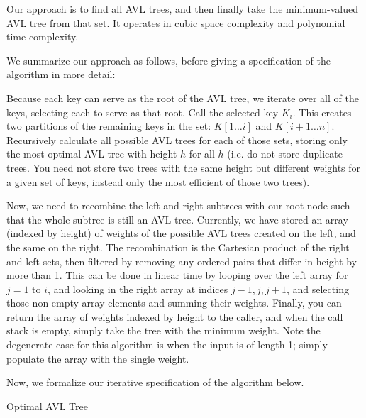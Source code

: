 \documentclass[12pt]{article}
\begin{document}
Our approach is to find all AVL trees, and then finally take the minimum-valued AVL tree from that set. It operates in cubic space complexity and polynomial time complexity.

We summarize our approach as follows, before giving a specification of the algorithm in more detail:

Because each key can serve as the root of the AVL tree, we iterate over all of the keys, selecting each to serve as that root. Call the selected key $K_i$. This creates two partitions of the remaining keys in the set: $K[1\dots i]$ and $K[i+1 \dots n]$. Recursively calculate all possible AVL trees for each of those sets, storing only the most optimal AVL tree with height $h$ for all $h$ (i.e. do not store duplicate trees. You need not store two trees with the same height but different weights for a given set of keys, instead only the most efficient of those two trees). 

Now, we need to recombine the left and right subtrees with our root node such that the whole subtree is still an AVL tree. Currently, we have stored an array (indexed by height) of weights of the possible AVL trees created on the left, and the same on the right. The recombination is the Cartesian product of the right and left sets, then filtered by removing any ordered pairs that differ in height by more than 1. This can be done in linear time by looping over the left array for $j = 1 \text{ to } i$, and looking in the right array at indices $j-1, j, j+1$, and selecting those non-empty array elements and summing their weights. Finally, you can return the array of weights indexed by height to the caller, and when the call stack is empty, simply take the tree with the minimum weight. Note the degenerate case for this algorithm is when the input is of length 1; simply populate the array with the single weight.

Now, we formalize our iterative specification of the algorithm below.

\begin{algorithm}
\DontPrintSemicolon
{}

\caption{Optimal AVL Tree \label{AVL}}
\end{algorithm}
\end{document}
